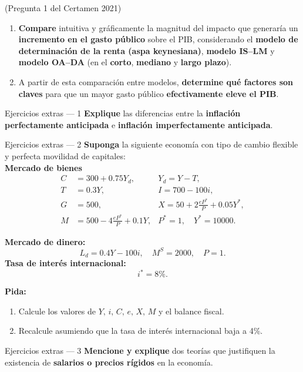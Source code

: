 \documentclass[aspectratio=169]{beamer}
\begin{document}
\begin{frame}[plain]
\end{frame}

\begin{frame}{(Pregunta 1 del Certamen 2021)}
\begin{enumerate}[label=\alph*)]
\item \textbf{Compare} intuitiva y gráficamente la magnitud del impacto que generaría un \textbf{incremento en el gasto público} sobre el PIB, considerando el \textbf{modelo de determinación de la renta (aspa keynesiana)}, \textbf{modelo IS–LM} y \textbf{modelo OA–DA} (en el \textbf{corto}, \textbf{mediano} y \textbf{largo plazo}).\\[0.25cm]
\item A partir de esta comparación entre modelos, \textbf{determine qué factores son claves} para que un mayor gasto público \textbf{efectivamente eleve el PIB}.
\end{enumerate}
\end{frame}

\begin{frame}[plain]
\end{frame}

\begin{frame}{Ejercicios extras — 1}
\textbf{Explique} las diferencias entre la \textbf{inflación perfectamente anticipada} e \textbf{inflación imperfectamente anticipada}.
\end{frame}

\begin{frame}[plain]
\end{frame}

\begin{frame}[shrink]{Ejercicios extras — 2}
\textbf{Suponga} la siguiente economía con tipo de cambio flexible y perfecta movilidad de capitales:\\[0.2cm]

\textbf{Mercado de bienes}
\[
\begin{aligned}
C &= 300 + 0.75Y_d, &Y_d = Y - T, \\
T &= 0.3Y, &I = 700 - 100i, \\
G &= 500, &X = 50 + 2\frac{eP^*}{P} + 0.05Y^*, \\
M &= 500 - 4\frac{eP^*}{P} + 0.1Y, &P^* = 1, \quad Y^* = 10000.
\end{aligned}
\]

\textbf{Mercado de dinero:}
\[
L_d = 0.4Y - 100i, \quad M^S = 2000, \quad P = 1.
\]
\textbf{Tasa de interés internacional:} 
\[
i^* = 8\%.
\]

\textbf{Pida:}
\begin{enumerate}[label=\alph*)]
\item Calcule los valores de \(Y,\, i,\, C,\, e,\, X,\, M\) y el balance fiscal. 
\item Recalcule asumiendo que la tasa de interés internacional baja a 4\%.
\end{enumerate}
\end{frame}

\begin{frame}[plain]
\end{frame}

\begin{frame}{Ejercicios extras — 3}
\textbf{Mencione y explique} dos teorías que justifiquen la existencia de \textbf{salarios o precios rígidos} en la economía.
\end{frame}
\end{document}
